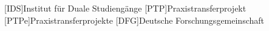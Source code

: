 [IDS]{Institut für Duale Studiengänge}
[PTP]{Praxistransferprojekt}
[PTPe]{Praxistransferprojekte}
[DFG]{Deutsche Forschungsgemeinschaft}